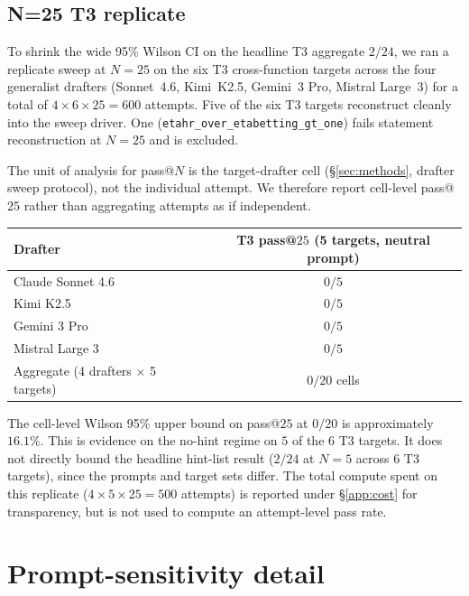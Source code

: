 \subsection{N=25 T3 replicate}
\label{app:n25-t3-replicate}

To shrink the wide 95\% Wilson CI on the headline T3 aggregate
$2/24$, we ran a replicate sweep at $N=25$ on the six T3
cross-function targets across the four generalist drafters
(Sonnet~4.6, Kimi~K2.5, Gemini~3 Pro, Mistral Large~3) for a
total of $4 \times 6 \times 25 = 600$ attempts. Five of the six
T3 targets reconstruct cleanly into the sweep driver. One
(\texttt{etahr\_over\_etabetting\_gt\_one}) fails statement
reconstruction at $N=25$ and is excluded.

The unit of analysis for pass@$N$ is the target-drafter cell
(\S\ref{sec:methods}, drafter sweep protocol), not the
individual attempt. We therefore report cell-level pass@$25$
rather than aggregating attempts as if independent.

\begin{table}[!t]
\centering
\small
\begin{tabular}{lc}
\toprule
Drafter & T3 pass@$25$ (5 targets, neutral prompt) \\
\midrule
Claude Sonnet 4.6 & $0/5$ \\
Kimi K2.5 & $0/5$ \\
Gemini 3 Pro & $0/5$ \\
Mistral Large 3 & $0/5$ \\
\midrule
Aggregate (4 drafters $\times$ 5 targets) & $0/20$ cells \\
\bottomrule
\end{tabular}
\end{table}

\smallskip
The cell-level Wilson 95\% upper bound on pass@$25$ at $0/20$
is approximately $16.1\%$. This is evidence on the no-hint
regime on $5$ of the $6$ T3 targets. It does not directly bound
the headline hint-list result ($2/24$ at $N=5$ across $6$ T3
targets), since the prompts and target sets differ. The total
compute spent on this replicate ($4 \times 5 \times 25 = 500$
attempts) is reported under \S\ref{app:cost} for transparency,
but is not used to compute an attempt-level pass rate.

\section{Prompt-sensitivity detail}
\label{app:prompt-sensitivity-detail}

